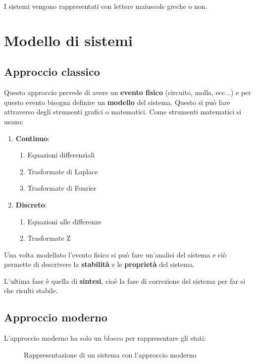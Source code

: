 \documentclass[a4paper]{article}
\begin{document}
\noindent
I sistemi vengono rappresentati con lettere maiuscole greche o non.

\section{Modello di sistemi}
\subsection{Approccio classico}
Questo approccio prevede di avere un \textbf{evento fisico} (circuito, molla, ecc...) e per
questo evento bisogna definire un \textbf{modello} del sistema. Questo si può fare attraverso
degli strumenti grafici o matematici. Come strumenti matematici si usano:
\begin{enumerate}
  \item \textbf{Continuo}: 
    \begin{enumerate}
      \item Equazioni differenziali
      \item Trasformate di Laplace
      \item Trasformate di Fourier
    \end{enumerate}
  \item \textbf{Discreto}: 
    \begin{enumerate}
      \item Equazioni alle differenze
      \item Trasformate Z
    \end{enumerate}
\end{enumerate}

\noindent Una volta modellato l'evento fisico si può fare un'analisi del sistema
e ciò permette di descrivere la \textbf{stabilità} e le \textbf{proprietà} del sistema.

\noindent
L'ultima fase è quella di \textbf{sintesi}, cioè la fase di correzione del sistema
per far si che risulti stabile.

\subsection{Approccio moderno}
L'approccio moderno ha solo un blocco per rappresentare gli stati:
\begin{figure}[H]
  \centering
  \caption{Rappresentazione di un sistema con l'approccio moderno}
\end{figure}
\end{document}
